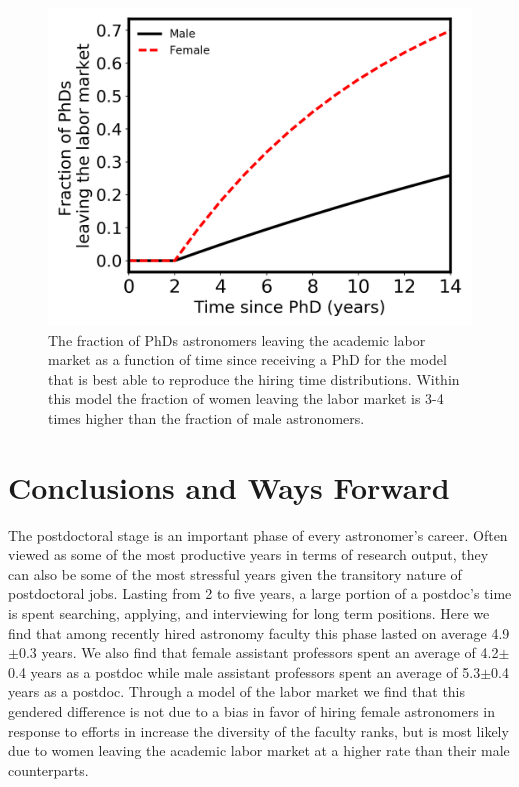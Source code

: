 \documentclass[modern]{aastex62}
\begin{document}
\begin{figure}[!hbt]
\center
\includegraphics[scale=.6]{df_model3.png}
\caption{The fraction of PhDs astronomers leaving the academic labor market as a function of time since receiving a PhD for the model that is best able to reproduce the hiring time distributions. Within this model the fraction of women leaving the labor market is 3-4 times higher than the fraction of male astronomers. \label{df_model3}}
\end{figure}


\section{Conclusions and Ways Forward}
The postdoctoral stage is an important phase of every astronomer's career. Often viewed as some of the most productive years in terms of research output, they can also be some of the most stressful years given the transitory nature of postdoctoral jobs. Lasting from 2 to five years, a large portion of a postdoc's time is spent searching, applying, and interviewing for long term positions. Here we find that among recently hired astronomy faculty this phase lasted on average 4.9$\pm$0.3 years. We also find that female assistant professors spent an average of 4.2$\pm$0.4 years as a postdoc while male assistant professors spent an average of 5.3$\pm$0.4 years as a postdoc. Through a model of the labor market we find that this gendered difference is not due to a bias in favor of hiring female astronomers in response to efforts in increase the diversity of the faculty ranks, but is most likely due to women leaving the academic labor market at a higher rate than their male counterparts. 
\end{document}
